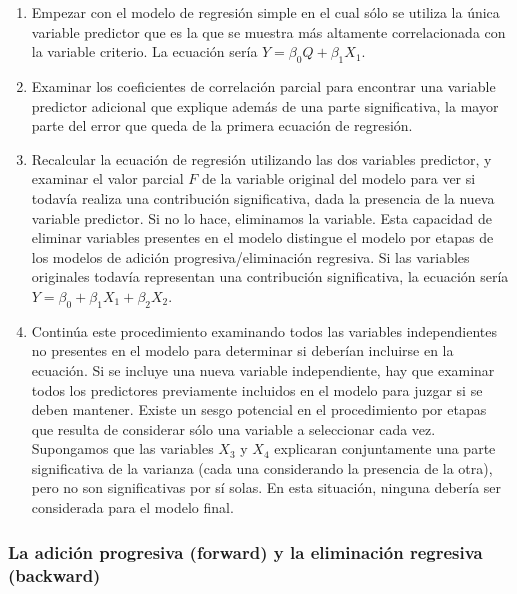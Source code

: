 \documentclass[
  12pt,
]{krantz}
\theoremstyle{definition}
\theoremstyle{definition}
\theoremstyle{definition}
\theoremstyle{remark}
\begin{document}
\begin{enumerate}
\def\labelenumi{\arabic{enumi}.}
\item
  Empezar con el modelo de regresión simple en el cual sólo se utiliza la única variable predictor que es la que se muestra más altamente correlacionada con la variable criterio. La ecuación sería \(Y= \beta_0 Q + \beta_1X_1\).
\item
  Examinar los coeficientes de correlación parcial para encontrar una variable predictor adicional que explique además de una parte significativa, la mayor parte del error que queda de la primera ecuación de regresión.
\item
  Recalcular la ecuación de regresión utilizando las dos variables predictor, y examinar el valor parcial \(F\) de la variable original del modelo para ver si todavía realiza una contribución significativa, dada la presencia de la nueva variable predictor. Si no lo hace, eliminamos la variable. Esta capacidad de eliminar variables presentes en el modelo distingue el modelo por etapas de los modelos de adición progresiva/eliminación regresiva. Si las variables originales todavía representan una contribución significativa, la ecuación sería \(Y = \beta_0 + \beta_1X_1 + \beta_2X_2\).
\item
  Continúa este procedimiento examinando todos las variables independientes no presentes en el modelo para determinar si deberían incluirse en la ecuación. Si se incluye una nueva variable independiente, hay que examinar todos los predictores previamente incluidos en el modelo para juzgar si se deben mantener. Existe un sesgo potencial en el procedimiento por etapas que resulta de considerar sólo una variable a seleccionar cada vez. Supongamos que las variables \(X_3\) y \(X_4\) explicaran conjuntamente una parte significativa de la varianza (cada una considerando la presencia de la otra), pero no son significativas por sí solas. En esta situación, ninguna debería ser considerada para el modelo final.
\end{enumerate}

\hypertarget{la-adicion-progresiva-forward-y-la-eliminacion-regresiva-backward}{%
\subsubsection{La adición progresiva (forward) y la eliminación regresiva (backward)}\label{la-adicion-progresiva-forward-y-la-eliminacion-regresiva-backward}}
\end{document}
